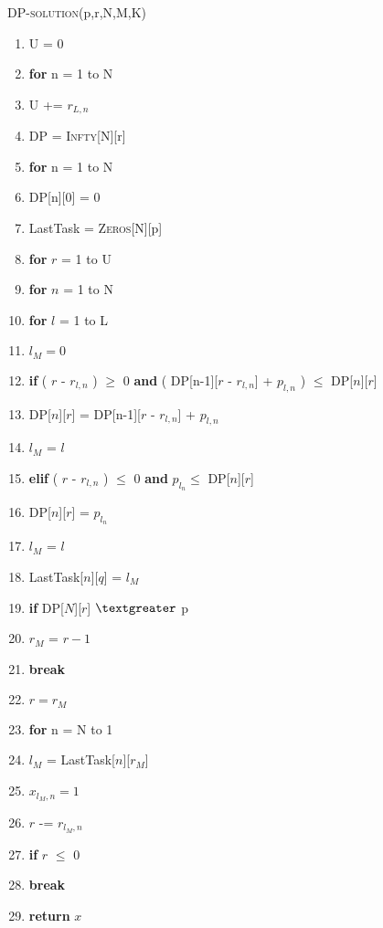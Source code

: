 \documentclass[11pt, oneside]{report}
\begin{document}
\noindent\textsc{DP-solution}(p,r,N,M,K)
\begin{enumerate}[1\ ]
\setlength{\topsep}{0.05ex}
\setlength{\itemsep}{0.05ex}
\item U = 0
\item \textbf{for} n = 1 to N
\item \qquad U += $r_{L,n}$
\item DP = \textsc{Infty}[N][r]
\item \textbf{for} n = 1 to N
\item \qquad DP[n][0] = 0
\item LastTask = \textsc{Zeros}[N][p]
\item \textbf{for} $r$ = 1 to U
\item \qquad \textbf{for} $n$ = 1 to N
\item \qquad \qquad \textbf{for} $l$ = 1 to L
\item \qquad \qquad \qquad $l_M = 0$
\item \qquad \qquad \qquad \textbf{if} ( $r$ - $r_{l,n}$ ) $\geq$ 0 \textbf{and}  ( DP[n-1][$r$ - $r_{l,n}$] + $p_{l,n}$ ) $\leq$ DP[$n$][$r$]
\item \qquad \qquad \qquad \qquad DP[$n$][$r$] = DP[n-1][$r$ - $r_{l,n}$] + $p_{l,n}$
\item \qquad \qquad \qquad \qquad $l_M$ = $l$
\item \qquad \qquad \qquad \textbf{elif} ( $r$ - $r_{l,n}$ ) $\leq$ 0 \textbf{and} $p_{l_n} \leq$ DP[$n$][$r$]
\item \qquad \qquad \qquad \qquad DP[$n$][$r$] = $p_{l_n}$
\item \qquad \qquad \qquad \qquad $l_M$ = $l$
\item \qquad \qquad LastTask[$n$][$q$] = $l_M$
\item \qquad \textbf{if} DP[$N$][$r$] $\textgreater$ p
\item \qquad \qquad $r_M$ = $r-1$
\item \qquad \qquad \textbf{break}
\item $r = r_M$
\item \textbf{for} n = N to 1
\item \qquad $l_M$ = LastTask[$n$][$r_M$]
\item \qquad $x_{l_M, n} = 1$
\item \qquad $r$ -= $r_{l_M, n}$
\item \qquad \textbf{if} $r$ $\leq$ 0
\item \qquad \qquad \textbf{break}
\item \textbf{return} $x$
\end{enumerate}
\end{document}
